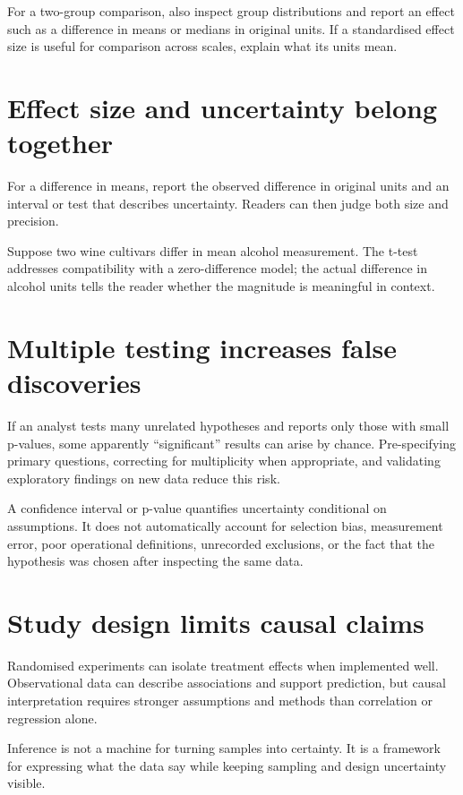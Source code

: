 For a two-group comparison, also inspect group distributions and report an effect such as a difference in means or medians in original units. If a standardised effect size is useful for comparison across scales, explain what its units mean.


\section{Effect size and uncertainty belong together}
For a difference in means, report the observed difference in original units and an interval or test that describes uncertainty. Readers can then judge both size and precision.

\begin{workedexample}
Suppose two wine cultivars differ in mean alcohol measurement. The t-test addresses compatibility with a zero-difference model; the actual difference in alcohol units tells the reader whether the magnitude is meaningful in context.
\end{workedexample}


\section{Multiple testing increases false discoveries}
If an analyst tests many unrelated hypotheses and reports only those with small p-values, some apparently ``significant'' results can arise by chance. Pre-specifying primary questions, correcting for multiplicity when appropriate, and validating exploratory findings on new data reduce this risk.

\begin{pitfall}
A confidence interval or p-value quantifies uncertainty conditional on assumptions. It does not automatically account for selection bias, measurement error, poor operational definitions, unrecorded exclusions, or the fact that the hypothesis was chosen after inspecting the same data.
\end{pitfall}


\section{Study design limits causal claims}
Randomised experiments can isolate treatment effects when implemented well. Observational data can describe associations and support prediction, but causal interpretation requires stronger assumptions and methods than correlation or regression alone.

\begin{keyidea}
Inference is not a machine for turning samples into certainty. It is a framework for expressing what the data say while keeping sampling and design uncertainty visible.
\end{keyidea}

